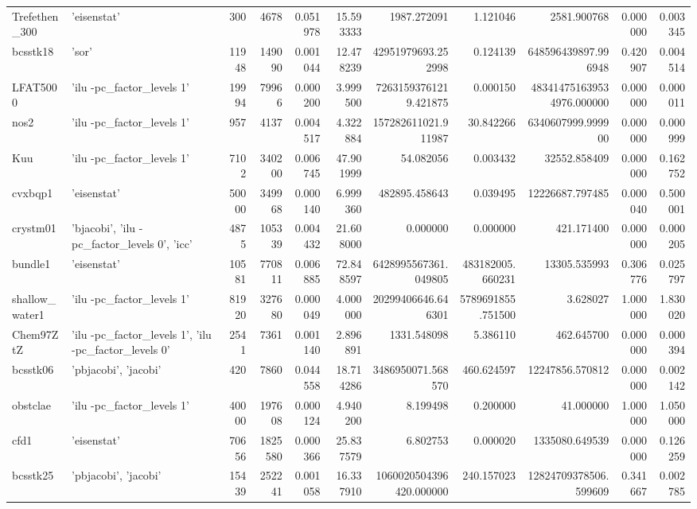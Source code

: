\begin{tabular}{llrrrrrrrrr}
Trefethen\_300 & {'eisenstat'} & 300 & 4678 & 0.051978 & 15.593333 & 1987.272091 & 1.121046 & 2581.900768 & 0.000000 & 0.003345 \\
bcsstk18 & {'sor'} & 11948 & 149090 & 0.001044 & 12.478239 & 42951979693.252998 & 0.124139 & 648596439897.996948 & 0.420907 & 0.004514 \\
LFAT5000 & {'ilu -pc\_factor\_levels 1'} & 19994 & 79966 & 0.000200 & 3.999500 & 72631593761219.421875 & 0.000150 & 483414751639534976.000000 & 0.000000 & 0.000011 \\
nos2 & {'ilu -pc\_factor\_levels 1'} & 957 & 4137 & 0.004517 & 4.322884 & 157282611021.911987 & 30.842266 & 6340607999.999900 & 0.000000 & 0.000999 \\
Kuu & {'ilu -pc\_factor\_levels 1'} & 7102 & 340200 & 0.006745 & 47.901999 & 54.082056 & 0.003432 & 32552.858409 & 0.000000 & 0.162752 \\
cvxbqp1 & {'eisenstat'} & 50000 & 349968 & 0.000140 & 6.999360 & 482895.458643 & 0.039495 & 12226687.797485 & 0.000040 & 0.500001 \\
crystm01 & {'bjacobi', 'ilu -pc\_factor\_levels 0', 'icc'} & 4875 & 105339 & 0.004432 & 21.608000 & 0.000000 & 0.000000 & 421.171400 & 0.000000 & 0.000205 \\
bundle1 & {'eisenstat'} & 10581 & 770811 & 0.006885 & 72.848597 & 6428995567361.049805 & 483182005.660231 & 13305.535993 & 0.306776 & 0.025797 \\
shallow\_water1 & {'ilu -pc\_factor\_levels 1'} & 81920 & 327680 & 0.000049 & 4.000000 & 20299406646.646301 & 5789691855.751500 & 3.628027 & 1.000000 & 1.830020 \\
Chem97ZtZ & {'ilu -pc\_factor\_levels 1', 'ilu -pc\_factor\_levels 0'} & 2541 & 7361 & 0.001140 & 2.896891 & 1331.548098 & 5.386110 & 462.645700 & 0.000000 & 0.000394 \\
bcsstk06 & {'pbjacobi', 'jacobi'} & 420 & 7860 & 0.044558 & 18.714286 & 3486950071.568570 & 460.624597 & 12247856.570812 & 0.000000 & 0.002142 \\
obstclae & {'ilu -pc\_factor\_levels 1'} & 40000 & 197608 & 0.000124 & 4.940200 & 8.199498 & 0.200000 & 41.000000 & 1.000000 & 1.050000 \\
cfd1 & {'eisenstat'} & 70656 & 1825580 & 0.000366 & 25.837579 & 6.802753 & 0.000020 & 1335080.649539 & 0.000000 & 0.126259 \\
bcsstk25 & {'pbjacobi', 'jacobi'} & 15439 & 252241 & 0.001058 & 16.337910 & 1060020504396420.000000 & 240.157023 & 12824709378506.599609 & 0.341667 & 0.002785 \\

\end{tabular}
